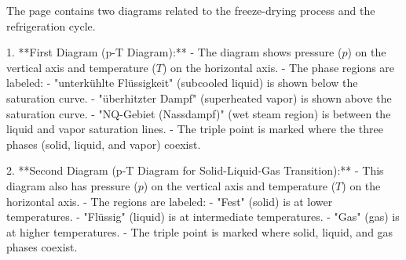 The page contains two diagrams related to the freeze-drying process and the refrigeration cycle.  

1. **First Diagram (p-T Diagram):**  
   - The diagram shows pressure (\( p \)) on the vertical axis and temperature (\( T \)) on the horizontal axis.  
   - The phase regions are labeled:  
     - "unterkühlte Flüssigkeit" (subcooled liquid) is shown below the saturation curve.  
     - "überhitzter Dampf" (superheated vapor) is shown above the saturation curve.  
     - "NQ-Gebiet (Nassdampf)" (wet steam region) is between the liquid and vapor saturation lines.  
   - The triple point is marked where the three phases (solid, liquid, and vapor) coexist.  

2. **Second Diagram (p-T Diagram for Solid-Liquid-Gas Transition):**  
   - This diagram also has pressure (\( p \)) on the vertical axis and temperature (\( T \)) on the horizontal axis.  
   - The regions are labeled:  
     - "Fest" (solid) is at lower temperatures.  
     - "Flüssig" (liquid) is at intermediate temperatures.  
     - "Gas" (gas) is at higher temperatures.  
   - The triple point is marked where solid, liquid, and gas phases coexist.
